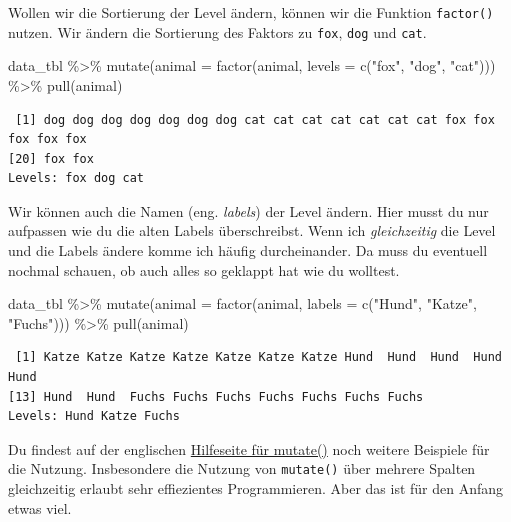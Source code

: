 \documentclass[
  letterpaper,
  DIV=11,
  oneside]{scrreport}
\newenvironment{Shaded}{\begin{snugshade}}{\end{snugshade}}
\newcommand{\AttributeTok}[1]{\textcolor[rgb]{0.40,0.45,0.13}{#1}}
\newcommand{\FunctionTok}[1]{\textcolor[rgb]{0.28,0.35,0.67}{#1}}
\newcommand{\NormalTok}[1]{\textcolor[rgb]{0.00,0.23,0.31}{#1}}
\newcommand{\SpecialCharTok}[1]{\textcolor[rgb]{0.37,0.37,0.37}{#1}}
\newcommand{\StringTok}[1]{\textcolor[rgb]{0.13,0.47,0.30}{#1}}
\begin{document}
Wollen wir die Sortierung der Level ändern, können wir die Funktion
\texttt{factor()} nutzen. Wir ändern die Sortierung des Faktors zu
\texttt{fox}, \texttt{dog} und \texttt{cat}.

\begin{Shaded}
\begin{Highlighting}[]
\NormalTok{data\_tbl }\SpecialCharTok{\%\textgreater{}\%} 
  \FunctionTok{mutate}\NormalTok{(}\AttributeTok{animal =} \FunctionTok{factor}\NormalTok{(animal, }\AttributeTok{levels =} \FunctionTok{c}\NormalTok{(}\StringTok{"fox"}\NormalTok{, }\StringTok{"dog"}\NormalTok{, }\StringTok{"cat"}\NormalTok{))) }\SpecialCharTok{\%\textgreater{}\%} 
  \FunctionTok{pull}\NormalTok{(animal)}
\end{Highlighting}
\end{Shaded}

\begin{verbatim}
 [1] dog dog dog dog dog dog dog cat cat cat cat cat cat cat fox fox fox fox fox
[20] fox fox
Levels: fox dog cat
\end{verbatim}

Wir können auch die Namen (eng. \emph{labels}) der Level ändern. Hier
musst du nur aufpassen wie du die alten Labels überschreibst. Wenn ich
\emph{gleichzeitig} die Level und die Labels ändere komme ich häufig
durcheinander. Da muss du eventuell nochmal schauen, ob auch alles so
geklappt hat wie du wolltest.

\begin{Shaded}
\begin{Highlighting}[]
\NormalTok{data\_tbl }\SpecialCharTok{\%\textgreater{}\%} 
  \FunctionTok{mutate}\NormalTok{(}\AttributeTok{animal =} \FunctionTok{factor}\NormalTok{(animal, }\AttributeTok{labels =} \FunctionTok{c}\NormalTok{(}\StringTok{"Hund"}\NormalTok{, }\StringTok{"Katze"}\NormalTok{, }\StringTok{"Fuchs"}\NormalTok{))) }\SpecialCharTok{\%\textgreater{}\%} 
  \FunctionTok{pull}\NormalTok{(animal)}
\end{Highlighting}
\end{Shaded}

\begin{verbatim}
 [1] Katze Katze Katze Katze Katze Katze Katze Hund  Hund  Hund  Hund  Hund 
[13] Hund  Hund  Fuchs Fuchs Fuchs Fuchs Fuchs Fuchs Fuchs
Levels: Hund Katze Fuchs
\end{verbatim}

Du findest auf der englischen
\href{https://dplyr.tidyverse.org/reference/mutate.html}{Hilfeseite für
mutate()} noch weitere Beispiele für die Nutzung. Insbesondere die
Nutzung von \texttt{mutate()} über mehrere Spalten gleichzeitig erlaubt
sehr effiezientes Programmieren. Aber das ist für den Anfang etwas viel.
\end{document}
